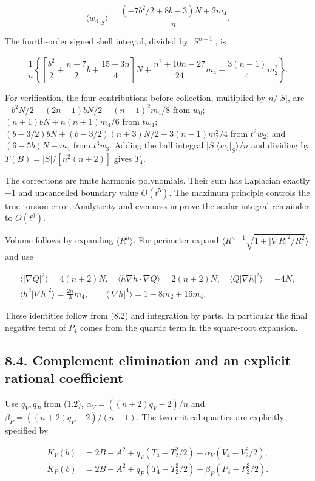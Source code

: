 \documentclass[11pt]{article}
\begin{document}
\[
\langle w_4|_S\rangle
=\frac{(-7b^2/2+8b-3)N+2m_4}{n}.
\tag{8.16}
\]

The fourth-order signed shell integral, divided by \(|S^{n-1}|\), is

\[
\frac1n\left\{\left[\frac{b^2}2+\frac{n-7}2b+\frac{15-3n}4\right]N
+\frac{n^2+10n-27}{24}m_4-\frac{3(n-1)}4m_2^2\right\}.
\tag{8.17}
\]

For verification, the four contributions before collection, multiplied
by \(n/|S|\), are \(-b^2N/2-(2n-1)bN/2-(n-1)^2m_4/8\) from \(w_0\);
\((n+1)bN+n(n+1)m_4/6\) from \(tw_1\);
\((b-3/2)bN+(b-3/2)(n+3)N/2-3(n-1)m_2^2/4\) from \(t^2w_2\); and
\((6-5b)N-m_4\) from \(t^3w_3\). Adding the ball integral
\(|S|\langle w_4|_S\rangle/n\) and dividing by \(T(B)=|S|/[n^2(n+2)]\)
gives \(T_4\).

The corrections are finite harmonic polynomials. Their sum has Laplacian
exactly \(-1\) and uncancelled boundary value \(O(t^5)\). The maximum
principle controls the true torsion error. Analyticity and evenness
improve the scalar integral remainder to \(O(t^6)\).

Volume follows by expanding \(\langle R^n\rangle\). For perimeter expand
\(\langle R^{n-1}\sqrt{1+|\nabla R|^2/R^2}\rangle\) and use

\[
\begin{gathered}
\langle|\nabla Q|^2\rangle=4(n+2)N,\quad
\langle h\nabla h\cdot\nabla Q\rangle=2(n+2)N,\quad
\langle Q|\nabla h|^2\rangle=-4N,\\
\langle h^2|\nabla h|^2\rangle=\frac{2n}3m_4,\qquad
\langle|\nabla h|^4\rangle=1-8m_2+16m_4.
\end{gathered}
\tag{8.18}
\]

These identities follow from (8.2) and integration by parts. In
particular the final negative term of \(P_4\) comes from the quartic
term in the square-root expansion.

\subsection{8.4. Complement elimination and an explicit rational
coefficient}\label{complement-elimination-and-an-explicit-rational-coefficient}

Use \(q_V,q_P\) from (1.2), \(\alpha_V=((n+2)q_V-2)/n\) and
\(\beta_P=((n+2)q_P-2)/(n-1)\). The two critical quartics are explicitly
specified by

\[
\begin{aligned}
K_V(b)&=2B-A^2+q_V(T_4-T_2^2/2)-\alpha_V(V_4-V_2^2/2),\\
K_P(b)&=2B-A^2+q_P(T_4-T_2^2/2)-\beta_P(P_4-P_2^2/2).
\end{aligned}
\tag{8.19}
\]
\end{document}
